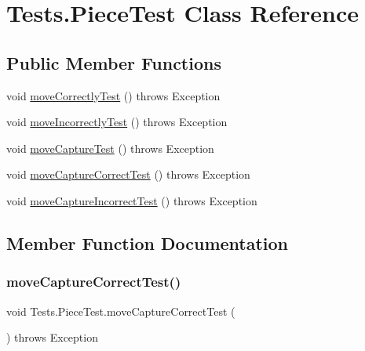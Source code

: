 \hypertarget{class_tests_1_1_piece_test}{}\section{Tests.\+Piece\+Test Class Reference}
\label{class_tests_1_1_piece_test}
\subsection*{Public Member Functions}
\begin{DoxyCompactItemize}
\item 
void \hyperlink{class_tests_1_1_piece_test_a0fdc15fc8b9af9c9ce04f5299f2377af}{move\+Correctly\+Test} ()  throws Exception 
\item 
void \hyperlink{class_tests_1_1_piece_test_a8ddf1c5f3a0bdcfffb6d4f320359e116}{move\+Incorrectly\+Test} ()  throws Exception 
\item 
void \hyperlink{class_tests_1_1_piece_test_a54f13d626be4b8851a6f4c6e48cfa5a5}{move\+Capture\+Test} ()  throws Exception 
\item 
void \hyperlink{class_tests_1_1_piece_test_ada0c95d102637e100ea72e0406ab6358}{move\+Capture\+Correct\+Test} ()  throws Exception 
\item 
void \hyperlink{class_tests_1_1_piece_test_ac169d0c67848dc536eed9e0eb8fbfdce}{move\+Capture\+Incorrect\+Test} ()  throws Exception 
\end{DoxyCompactItemize}


\subsection{Member Function Documentation}
\mbox{\label{class_tests_1_1_piece_test_ada0c95d102637e100ea72e0406ab6358}} 
\subsubsection{\texorpdfstring{move\+Capture\+Correct\+Test()}{moveCaptureCorrectTest()}}
{\footnotesize\ttfamily void Tests.\+Piece\+Test.\+move\+Capture\+Correct\+Test (\begin{DoxyParamCaption}{ }\end{DoxyParamCaption}) throws Exception\hspace{0.3cm}{\ttfamily [inline]}}

